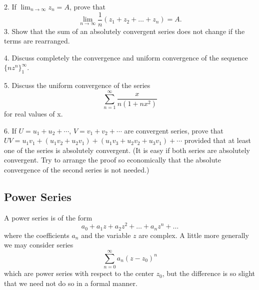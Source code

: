 2. If $\lim_{n\to \infty}z_n = A$, prove that
\begin{equation*}
\lim _ {n \rightarrow \infty} \frac {1}{n} \left(z _ {1} + z _ {2} + \dots + z _ {n}\right) = A.
\end{equation*}
3. Show that the sum of an absolutely convergent series does not change if the terms are rearranged.

4. Discuss completely the convergence and uniform convergence of the sequence $\{nz^{n}\}_{1}^{\infty}$.

5. Discuss the uniform convergence of the series
\begin{equation*}
\sum_ {n = 1} ^ {\infty} \frac {x}{n (1 + n x ^ {2})}
\end{equation*}
for real values of x.

6. If $U = u_{1} + u_{2} + \cdots$, $V = v_{1} + v_{2} + \cdots$ are convergent series, prove that $UV = u_{1}v_{1} + (u_{1}v_{2} + u_{2}v_{1}) + (u_{1}v_{3} + u_{2}v_{2} + u_{3}v_{1}) + \cdots$ provided that at least one of the series is absolutely convergent. (It is easy if both series are absolutely convergent. Try to arrange the proof so economically that the absolute convergence of the second series is not needed.)


\setcounter{section}{2}\setcounter{subsection}{3}\subsection{Power Series}\label{sec:2.2.4}
A power series is of the form
\begin{equation*}
a _ {0} + a _ {1} z + a _ {2} z ^ {2} + \dots + a _ {n} z ^ {n} + \dots\tag{17}\label{eq:2.17}
\end{equation*}
where the coefficients $a_{n}$ and the variable $z$ are complex. A little more generally we may consider series
\begin{equation*}
\sum_ {n = 0} ^ {\infty} a _ {n} (z - z _ {0}) ^ {n}
\end{equation*}
which are power series with respect to the center $z_{0}$, but the difference is so slight that we need not do so in a formal manner.

